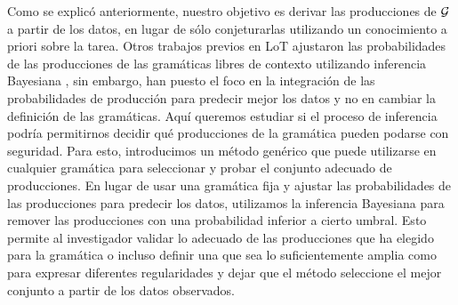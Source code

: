 
Como se explicó anteriormente, nuestro objetivo es derivar las producciones de $\gram$ a partir de los datos, en lugar de sólo conjeturarlas utilizando un conocimiento a priori sobre la tarea. Otros trabajos previos en LoT ajustaron las probabilidades de las producciones de las gramáticas libres de contexto utilizando inferencia Bayesiana \cite{piantadosi2016logical}, sin embargo, han puesto el foco en la integración de las probabilidades de producción para predecir mejor los datos y no en cambiar la definición de las gramáticas. Aquí queremos estudiar si el proceso de inferencia podría permitirnos decidir qué producciones de la gramática pueden podarse con seguridad. Para esto, introducimos un método genérico que puede utilizarse en cualquier gramática para seleccionar y probar el conjunto adecuado de producciones. En lugar de usar una gramática fija y ajustar las probabilidades de las producciones para predecir los datos, utilizamos la inferencia Bayesiana para remover las producciones con una probabilidad inferior a cierto umbral. Esto permite al investigador validar lo adecuado de las producciones que ha elegido para la gramática o incluso definir una que sea lo suficientemente amplia como para expresar diferentes regularidades y dejar que el método seleccione el mejor conjunto a partir de los datos observados.   


